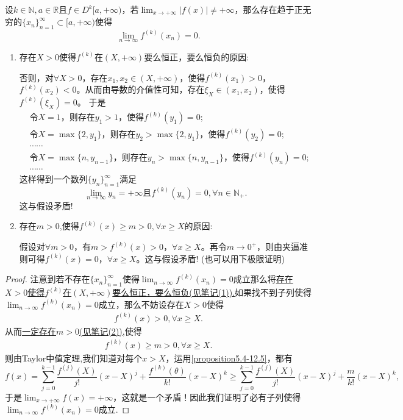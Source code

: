 \documentclass[../../main.tex]{subfiles}
\begin{document}
\begin{proposition}\label{proposition:函数不爆破则各阶导数必然有趋于 0 的子列}
设\(k\in\mathbb{N},a\in\mathbb{R}\)且\(f\in D^{k}[a,+\infty)\)，若\(\lim_{x\rightarrow +\infty}|f(x)|\neq +\infty\)，那么存在趋于正无穷的\(\{x_n\}_{n = 1}^{\infty}\subset [a,+\infty)\)使得
\[
\lim_{n\rightarrow\infty}f^{(k)}(x_n)=0.
\]
\end{proposition}
\begin{note}
\begin{enumerate}[(1)]
\item \hypertarget{proposition5.4由假设得到这个结论的原因}{存在\(X > 0\)使得\(f^{(k)}\)在\((X,+\infty)\)要么恒正，要么恒负的原因:}否则，对\(\forall X>0\)，存在\(x_1,x_2\in (X,+\infty)\)，使得\(f^{(k)}(x_1)>0\)，\(f^{(k)}(x_2)<0\)。从而由导数的介值性可知，存在\(\xi_X\in (x_1,x_2)\)，使得\(f^{(k)}(\xi_X) = 0\)。
于是
\begin{align*}
&\text{令}X = 1\text{，则存在}y_1>1\text{，使得}f^{(k)}(y_1)=0;\\
&\text{令}X=\max\{2,y_1\}\text{，则存在}y_2>\max\{2,y_1\}\text{，使得}f^{(k)}(y_2)=0;\\
&\cdots\cdots\\
&\text{令}X=\max\{n,y_{n - 1}\}\text{，则存在}y_n>\max\{n,y_{n - 1}\}\text{，使得}f^{(k)}(y_n)=0;\\
&\cdots\cdots
\end{align*}
这样得到一个数列\(\{y_n\}_{n = 1}^{\infty}\)满足
\[
\lim_{n\rightarrow \infty}y_n=+\infty\text{且}f^{(k)}(y_n)=0,\forall n\in \mathbb{N}_+.
\]
这与假设矛盾!

\item \hypertarget{m的存在性}{存在$m>0$,使得$f^{(k)}(x)\geqslant m>0,\forall x\geqslant X$的原因:}假设对\(\forall m>0\)，有\(m > f^{(k)}(x) > 0\)，\(\forall x\geqslant X\)。再令\(m\rightarrow 0^+\)，则由夹逼准则可得\(f^{(k)}(x) = 0\)，\(\forall x\geqslant X\)。这与假设矛盾!
(也可以用下极限证明)
\end{enumerate}
\end{note}
\begin{proof}
注意到若不存在\(\{x_n\}_{n = 1}^{\infty}\)使得\(\lim_{n\rightarrow\infty}f^{(k)}(x_n)=0\)成立那么将\hyperlink{proposition5.4由假设得到这个结论的原因}{存在\(X > 0\)使得\(f^{(k)}\)在\((X,+\infty)\)要么恒正，要么恒负(见笔记(1)).}如果找不到子列使得\(\lim_{n\rightarrow\infty}f^{(k)}(x_n)=0\)成立，那么不妨设存在\(X> 0\)使得
\begin{align*}
f^{(k)}(x)>0,\forall x\geqslant X.
\end{align*}
从而\hyperlink{m的存在性}{一定存在$m>0$(见笔记(2))},使得
\begin{align}\label{proposition5.4-12.5}
f^{(k)}(x)\geqslant m>0,\forall x\geqslant X.
\end{align}
则由Taylor中值定理,我们知道对每个\(x > X\)，运用\eqref{proposition5.4-12.5}，都有
\[f(x)=\sum_{j = 0}^{k - 1}\frac{f^{(j)}(X)}{j!}(x - X)^j+\frac{f^{(k)}(\theta)}{k!}(x - X)^k\geqslant\sum_{j = 0}^{k - 1}\frac{f^{(j)}(X)}{j!}(x - X)^j+\frac{m}{k!}(x - X)^k,\]
于是\(\lim_{x\rightarrow +\infty}f(x)=+\infty\)，这就是一个矛盾！因此我们证明了必有子列使得\(\lim_{n\rightarrow\infty}f^{(k)}(x_n)=0\)成立.
\end{proof}
\end{document}
